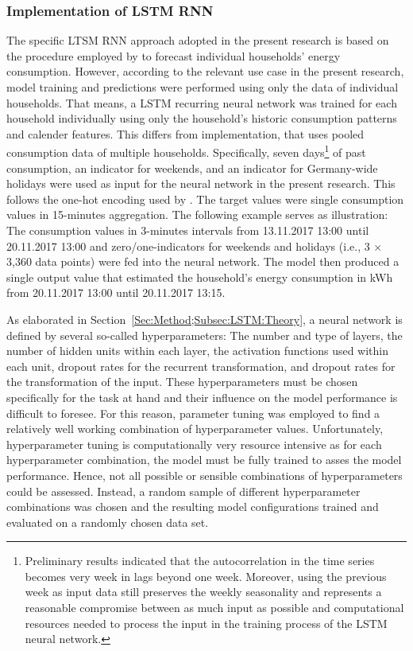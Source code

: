 \subsubsection{Implementation of LSTM RNN} \label{Sec:Method;Subsec:LSTM:Imp}

The specific LTSM RNN approach adopted in the present research is based on the procedure employed by \citet{Shi:2017} to forecast individual households' energy consumption. However, according to the relevant use case in the present research, model training and predictions were performed using only the data of individual households. That means, a LSTM recurring neural network was trained for each household individually using only the household's historic consumption patterns and calender features. This differs from \cites{Shi:2017} implementation, that uses pooled consumption data of multiple households. Specifically, seven days\footnote{Preliminary results indicated that the autocorrelation in the time series becomes very week in lags beyond one week. Moreover, using the previous week as input data still preserves the weekly seasonality and represents a reasonable compromise between as much input as possible and computational resources needed to process the input in the training process of the LSTM neural network.} of past consumption, an indicator for weekends, and an indicator for Germany-wide holidays were used as input for the neural network in the present research. This follows the one-hot encoding used by \citet{Chen:2018}. The target values were single consumption values in 15-minutes aggregation. The following example serves as illustration: The consumption values in 3-minutes intervals from 13.11.2017 13:00 until 20.11.2017 13:00 and zero/one-indicators for weekends and holidays (i.e., 3 $\times$ 3,360 data points) were fed into the neural network. The model then produced a single output value that estimated the household's energy consumption in kWh from 20.11.2017 13:00 until 20.11.2017 13:15.

As elaborated in Section~\ref{Sec:Method;Subsec:LSTM:Theory}, a neural network is defined by several so-called hyperparameters: The number and type of layers, the number of hidden units within each layer, the activation functions used within each unit, dropout rates for the recurrent transformation, and dropout rates for the transformation of the input. These hyperparameters must be chosen specifically for the task at hand and their influence on the model performance is difficult to foresee. For this reason, parameter tuning was employed to find a relatively well working combination of hyperparameter values. Unfortunately, hyperparameter tuning is computationally very resource intensive as for each hyperparameter combination, the model must be fully trained to asses the model performance. Hence, not all possible or sensible combinations of hyperparameters could be assessed. Instead, a random sample of different hyperparameter combinations was chosen and the resulting model configurations trained and evaluated on a randomly chosen data set.

